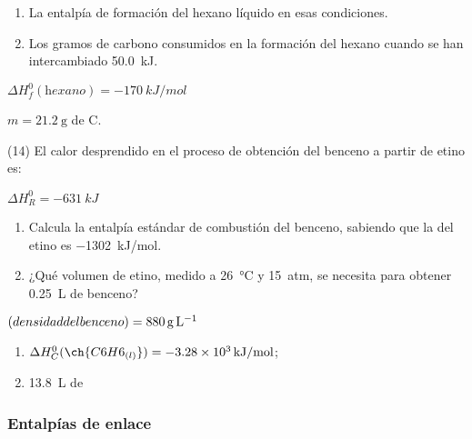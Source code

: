 \documentclass[10pt]{article}
\newenvironment{gexdatos}{
    \noindent\makebox[0pt][r]{\textit{Datos:}}
}{\vspace{5pt}}
\begin{document}
\begin{multicols}{2}
\begin{exercise}
  \begin{enumerate}
    \item La entalpía de formación del hexano líquido en esas condiciones.
    \item Los gramos de carbono consumidos en la formación del hexano cuando se han intercambiado \SI{50.0}{kJ}.

  \end{enumerate}
\end{exercise}

\begin{solution}
  \begin{enumerate*}
    \item \( \Delta H^0_f (\textit{hexano}) = \SI{-170}{kJ/mol} \) \item \( m = \SI{21.2}{\gram} \) de C.
  \end{enumerate*}
\end{solution}


\begin{exercise}
  (14) El calor desprendido en el proceso de obtención del benceno a partir de etino es:

   \( \Delta H^0_R = \SI{-631}{kJ} \)

  \begin{enumerate}
    \item Calcula la entalpía estándar de combustión del benceno, sabiendo que la del etino es \SI{-1302}{kJ/mol}.
    \item ¿Qué volumen de etino, medido a \SI{26}{\celsius} y \SI{15}{atm}, se necesita para obtener \SI{0.25}{\liter} de benceno?
  \end{enumerate}

  \begin{gexdatos}
    \( \textrm(densidad del benceno) = \SI{880}{\gram\per\liter} \)
  \end{gexdatos}

\end{exercise}

\begin{solution}
  \begin{enumerate}
    \item \( \Delta H^0_C (\ch{C6H6_{(l)}}) = \SI{-3.28e3}{kJ/mol} \); \item \SI{13.8}{\liter} de 
  \end{enumerate}
\end{solution}




\subsubsection{Entalpías de enlace}


\end{multicols}
\end{document}
